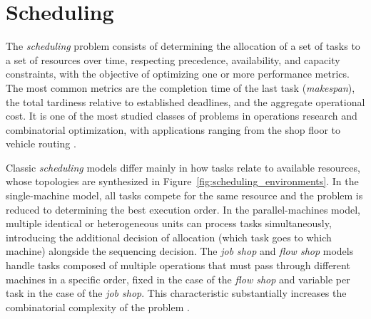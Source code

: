 \section{Scheduling}\label{sec:scheduling}

The \textit{scheduling} problem consists of determining the allocation of a set of tasks to a set of resources over time, respecting precedence, availability, and capacity constraints, with the objective of optimizing one or more performance metrics. The most common metrics are the completion time of the last task (\textit{makespan}), the total tardiness relative to established deadlines, and the aggregate operational cost. It is one of the most studied classes of problems in operations research and combinatorial optimization, with applications ranging from the shop floor to vehicle routing \cite{Pinedo2016}.

Classic \textit{scheduling} models differ mainly in how tasks relate to available resources, whose topologies are synthesized in Figure~\ref{fig:scheduling_environments}. In the single-machine model, all tasks compete for the same resource and the problem is reduced to determining the best execution order. In the parallel-machines model, multiple identical or heterogeneous units can process tasks simultaneously, introducing the additional decision of allocation (which task goes to which machine) alongside the sequencing decision. The \textit{job shop} and \textit{flow shop} models handle tasks composed of multiple operations that must pass through different machines in a specific order, fixed in the case of the \textit{flow shop} and variable per task in the case of the \textit{job shop}. This characteristic substantially increases the combinatorial complexity of the problem \cite{Garey1976, Xiong2022}.

